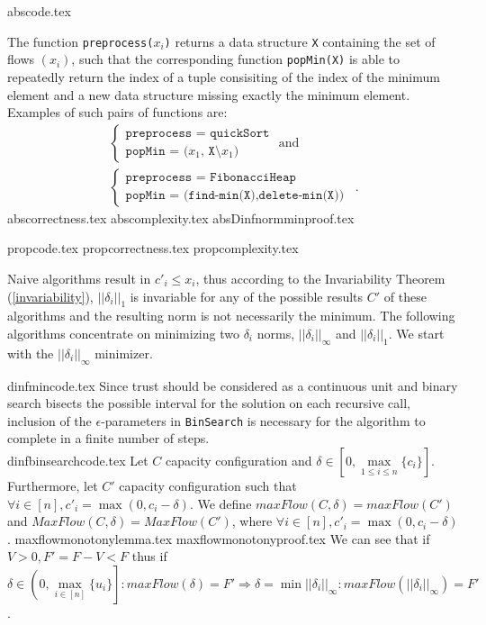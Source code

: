 \documentclass[11pt]{llncs}
\begin{document}
  {abscode.tex}

  The function \texttt{preprocess(}$x_i$\texttt{)} returns a data structure \texttt{X} containing the set of flows
  $\left(x_i\right)$, such that the corresponding function \texttt{popMin(X)} is able to repeatedly return the index of a
  tuple consisiting of the index of the minimum element and a new data structure missing exactly the minimum element.
  Examples of such pairs of functions are:
  \begin{equation*}
  \begin{gathered}
    \begin{cases}
      \texttt{preprocess = quickSort} \\
      \texttt{popMin = (}x_1\texttt{, X}\setminus x_1\texttt{)}
    \end{cases}
    \mbox{ and} \\
    \begin{cases}
      \texttt{preprocess = FibonacciHeap} \\
      \texttt{popMin = (find-min(X),delete-min(X))}
    \end{cases} \enspace.
  \end{gathered}
  \end{equation*}
  {abscorrectness.tex}
  {abscomplexity.tex}
  {absDinfnormminproof.tex}

  {propcode.tex}
  {propcorrectness.tex}
  {propcomplexity.tex}

  Naive algorithms result in $c'_i \leq x_i$, thus according to the Invariability Theorem (\ref{invariability}),
  $||\delta_i||_1$ is invariable for any of the possible results $C'$ of these algorithms and the resulting norm is not
  necessarily the minimum. The following algorithms concentrate on minimizing two $\delta_i$ norms, $||\delta_i||_\infty$ and
  $||\delta_i||_1$. We start with the $||\delta_i||_\infty$ minimizer.

  {dinfmincode.tex}
  Since trust should be considered as a continuous unit and binary search bisects the possible interval for the solution
  on each recursive call, inclusion of the $\epsilon$-parameters in \texttt{BinSearch} is necessary for the algorithm to
  complete in a finite number of steps. \\
  {dinfbinsearchcode.tex}
  Let $C$ capacity configuration and $\delta \in [0, \max\limits_{1 \leq i \leq n}{\{c_i\}}]$. Furthermore, let $C'$ capacity
  configuration such that $\forall i \in [n], c'_i = \max{\left(0, c_i - \delta\right)}$. We define
  $maxFlow\left(C, \delta\right) = maxFlow\left(C'\right)$ and $MaxFlow\left(C, \delta\right) = MaxFlow\left(C'\right)$,
  where $\forall i \in [n], c'_i = \max{\left(0, c_i - \delta\right)}$. 
  {maxflowmonotonylemma.tex}
  {maxflowmonotonyproof.tex}
  We can see that if $V > 0, F' = F - V < F$ thus if $\delta \in \left(0, \max\limits_{i \in [n]}\{u_i\}\right]:
  maxFlow\left(\delta\right) = F' \Rightarrow \delta = \min||\delta_i||_\infty :
  maxFlow\left(||\delta_{i}||_{\infty}\right) = F'$.
\end{document}
